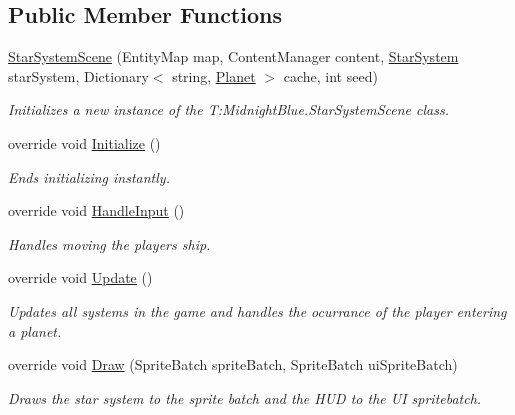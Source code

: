 \subsection*{Public Member Functions}
\begin{DoxyCompactItemize}
\item 
\hyperlink{class_midnight_blue_1_1_star_system_scene_a630b2de039b719d35fbdf572bbc69ea0}{Star\+System\+Scene} (Entity\+Map map, Content\+Manager content, \hyperlink{class_midnight_blue_1_1_star_system}{Star\+System} star\+System, Dictionary$<$ string, \hyperlink{class_midnight_blue_1_1_planet}{Planet} $>$ cache, int seed)
\begin{DoxyCompactList}\small\item\em Initializes a new instance of the T\+:\+Midnight\+Blue.\+Star\+System\+Scene class. \end{DoxyCompactList}\item 
override void \hyperlink{class_midnight_blue_1_1_star_system_scene_a1b593cd45d0f1b6c02f17ec5dd1033ca}{Initialize} ()
\begin{DoxyCompactList}\small\item\em Ends initializing instantly. \end{DoxyCompactList}\item 
override void \hyperlink{class_midnight_blue_1_1_star_system_scene_a9fd64901322082a4da8658650257163d}{Handle\+Input} ()
\begin{DoxyCompactList}\small\item\em Handles moving the players ship. \end{DoxyCompactList}\item 
override void \hyperlink{class_midnight_blue_1_1_star_system_scene_ac36506b721064e015a9f93140681d93a}{Update} ()
\begin{DoxyCompactList}\small\item\em Updates all systems in the game and handles the ocurrance of the player entering a planet. \end{DoxyCompactList}\item 
override void \hyperlink{class_midnight_blue_1_1_star_system_scene_ac3d90fb8d914d15b912f5da3cc1aa8a0}{Draw} (Sprite\+Batch sprite\+Batch, Sprite\+Batch ui\+Sprite\+Batch)
\begin{DoxyCompactList}\small\item\em Draws the star system to the sprite batch and the H\+UD to the UI spritebatch. \end{DoxyCompactList}\item 

\end{DoxyCompactItemize}

